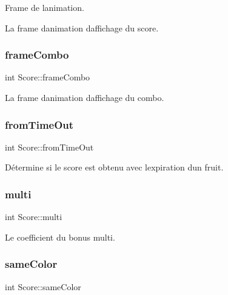 Frame de l\textquotesingle{}animation. 

La frame d\textquotesingle{}animation d\textquotesingle{}affichage du score. \mbox{\label{struct_score_abe66f83d6c5bc7b3f0696b964e634f13}} 
\subsubsection{\texorpdfstring{frame\+Combo}{frameCombo}}
{\footnotesize\ttfamily int Score\+::frame\+Combo}



La frame d\textquotesingle{}animation d\textquotesingle{}affichage du combo. 

\mbox{\label{struct_score_a38bc0a53e2cd2f80b8db25ec7ba1c452}} 
\subsubsection{\texorpdfstring{from\+Time\+Out}{fromTimeOut}}
{\footnotesize\ttfamily int Score\+::from\+Time\+Out}



Détermine si le score est obtenu avec l\textquotesingle{}expiration d\textquotesingle{}un fruit. 

\mbox{\label{struct_score_af57d7784cef50f04c462c81b01d20c41}} 
\subsubsection{\texorpdfstring{multi}{multi}}
{\footnotesize\ttfamily int Score\+::multi}



Le coefficient du bonus multi. 

\mbox{\label{struct_score_a91ef7ce4e1bd708788a6b42cccdc298a}} 
\subsubsection{\texorpdfstring{same\+Color}{sameColor}}
{\footnotesize\ttfamily int Score\+::same\+Color}




